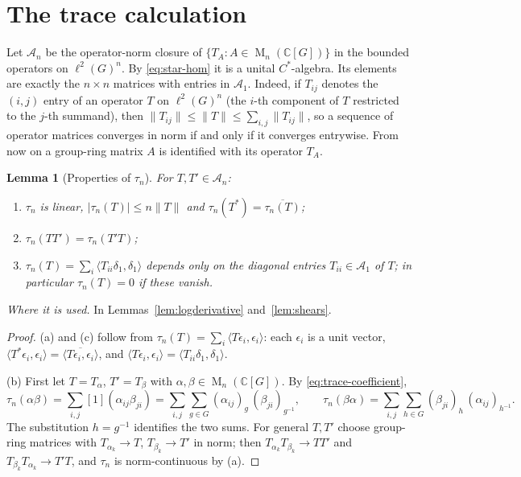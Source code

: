 \documentclass[11pt]{article}
\newtheorem{lemma}[theorem]{Lemma}
\theoremstyle{remark}
\numberwithin{equation}{section}
\newcommand{\C}{\mathbb C}
\newcommand{\Mat}{\operatorname{M}}
\begin{document}
\section{The trace calculation}
\label{sec:analysis}

Let $\mathcal A_n$ be the operator-norm closure of $\{T_A:A\in\Mat_n(\C[G])\}$ in the bounded operators on $\ell^2(G)^n$. By \eqref{eq:star-hom} it is a unital $C^*$-algebra. Its elements are exactly the $n\times n$ matrices with entries in $\mathcal A_1$. Indeed, if $T_{ij}$ denotes the $(i,j)$ entry of an operator $T$ on $\ell^2(G)^n$ (the $i$-th component of $T$ restricted to the $j$-th summand), then $\|T_{ij}\|\le\|T\|\le\sum_{i,j}\|T_{ij}\|$, so a sequence of operator matrices converges in norm if and only if it converges entrywise. From now on a group-ring matrix $A$ is identified with its operator $T_A$.

\begin{lemma}[Properties of $\tau_n$]\label{lem:trace}
For $T,T'\in\mathcal A_n$:
\begin{enumerate}[label=\textup{(\alph*)},leftmargin=2.2em]
\item $\tau_n$ is linear, $|\tau_n(T)|\le n\|T\|$ and $\tau_n(T^*)=\overline{\tau_n(T)}$;
\item $\tau_n(TT')=\tau_n(T'T)$;
\item $\tau_n(T)=\sum_i\langle T_{ii}\delta_1,\delta_1\rangle$ depends only on the diagonal entries $T_{ii}\in\mathcal A_1$ of $T$; in particular $\tau_n(T)=0$ if these vanish.
\end{enumerate}
\end{lemma}

\noindent\emph{Where it is used.} In Lemmas~\ref{lem:logderivative} and~\ref{lem:shears}.

\begin{proof}
(a) and (c) follow from $\tau_n(T)=\sum_i\langle T\epsilon_i,\epsilon_i\rangle$: each $\epsilon_i$ is a unit vector, $\langle T^*\epsilon_i,\epsilon_i\rangle=\overline{\langle T\epsilon_i,\epsilon_i\rangle}$, and $\langle T\epsilon_i,\epsilon_i\rangle=\langle T_{ii}\delta_1,\delta_1\rangle$.

(b) First let $T=T_\alpha$, $T'=T_\beta$ with $\alpha,\beta\in\Mat_n(\C[G])$. By \eqref{eq:trace-coefficient},
\[
 \tau_n(\alpha\beta)=\sum_{i,j}[1](\alpha_{ij}\beta_{ji})=\sum_{i,j}\sum_{g\in G}(\alpha_{ij})_g\,(\beta_{ji})_{g^{-1}},
 \qquad
 \tau_n(\beta\alpha)=\sum_{i,j}\sum_{h\in G}(\beta_{ji})_h\,(\alpha_{ij})_{h^{-1}} .
\]
The substitution $h=g^{-1}$ identifies the two sums. For general $T,T'$ choose group-ring matrices with $T_{\alpha_k}\to T$, $T_{\beta_k}\to T'$ in norm; then $T_{\alpha_k}T_{\beta_k}\to TT'$ and $T_{\beta_k}T_{\alpha_k}\to T'T$, and $\tau_n$ is norm-continuous by (a).
\end{proof}
\end{document}
